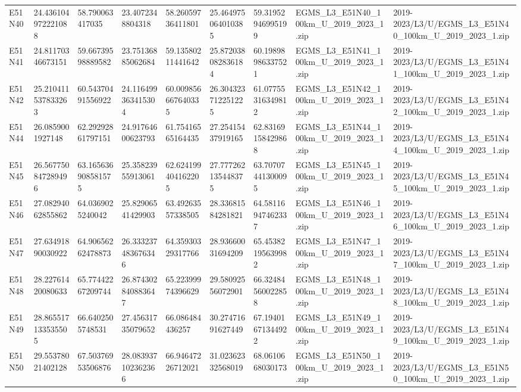 \begin{landscape}
\begin{longtable}{lllllllll}
E51N40 & 24.436104972221088 & 58.790063417035 & 23.4072348804318 & 58.26059736411801 & 25.464975064010385 & 59.31952946995199 & EGMS\_L3\_E51N40\_100km\_U\_2019\_2023\_1.zip & 2019-2023/L3/U/EGMS\_L3\_E51N40\_100km\_U\_2019\_2023\_1.zip \\
E51N41 & 24.81170346673151 & 59.66739598889582 & 23.75136885062684 & 59.13580211441642 & 25.872038082836184 & 60.19898986337521 & EGMS\_L3\_E51N41\_100km\_U\_2019\_2023\_1.zip & 2019-2023/L3/U/EGMS\_L3\_E51N41\_100km\_U\_2019\_2023\_1.zip \\
E51N42 & 25.210411537833263 & 60.54370491556922 & 24.116499363415304 & 60.009856667640335 & 26.304323712251225 & 61.07755316349812 & EGMS\_L3\_E51N42\_100km\_U\_2019\_2023\_1.zip & 2019-2023/L3/U/EGMS\_L3\_E51N42\_100km\_U\_2019\_2023\_1.zip \\
E51N44 & 26.0859001927148 & 62.29292861797151 & 24.91764600623793 & 61.75416565164435 & 27.25415437919165 & 62.83169158429868 & EGMS\_L3\_E51N44\_100km\_U\_2019\_2023\_1.zip & 2019-2023/L3/U/EGMS\_L3\_E51N44\_100km\_U\_2019\_2023\_1.zip \\
E51N45 & 26.567750847289496 & 63.165636908581575 & 25.35823955913061 & 62.624199404162205 & 27.777262135448375 & 63.70707441300095 & EGMS\_L3\_E51N45\_100km\_U\_2019\_2023\_1.zip & 2019-2023/L3/U/EGMS\_L3\_E51N45\_100km\_U\_2019\_2023\_1.zip \\
E51N46 & 27.08294062855862 & 64.0369025240042 & 25.82906541429903 & 63.49263557338505 & 28.33681584281821 & 64.58116947462337 & EGMS\_L3\_E51N46\_100km\_U\_2019\_2023\_1.zip & 2019-2023/L3/U/EGMS\_L3\_E51N46\_100km\_U\_2019\_2023\_1.zip \\
E51N47 & 27.63491890030922 & 64.90656262478873 & 26.333237483676346 & 64.35930329317766 & 28.93660031694209 & 65.45382195639982 & EGMS\_L3\_E51N47\_100km\_U\_2019\_2023\_1.zip & 2019-2023/L3/U/EGMS\_L3\_E51N47\_100km\_U\_2019\_2023\_1.zip \\
E51N48 & 28.22761420080633 & 65.77442267209744 & 26.874302840883647 & 65.22399974396629 & 29.58092556072901 & 66.32484560022858 & EGMS\_L3\_E51N48\_100km\_U\_2019\_2023\_1.zip & 2019-2023/L3/U/EGMS\_L3\_E51N48\_100km\_U\_2019\_2023\_1.zip \\
E51N49 & 28.865517133535505 & 66.6402505748531 & 27.45631735079652 & 66.086484436257 & 30.27471691627449 & 67.19401671344922 & EGMS\_L3\_E51N49\_100km\_U\_2019\_2023\_1.zip & 2019-2023/L3/U/EGMS\_L3\_E51N49\_100km\_U\_2019\_2023\_1.zip \\
E51N50 & 29.55378021402128 & 67.50376953506876 & 28.083937102362366 & 66.94647226712021 & 31.02362332568019 & 68.0610668030173 & EGMS\_L3\_E51N50\_100km\_U\_2019\_2023\_1.zip & 2019-2023/L3/U/EGMS\_L3\_E51N50\_100km\_U\_2019\_2023\_1.zip \\

\end{longtable}
\end{landscape}
